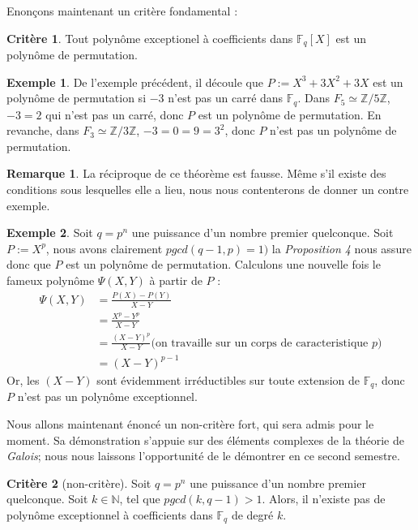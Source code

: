 \documentclass[12pt]{article}
\newcommand{\Fq}{\mathds{F}_q}
\theoremstyle{definition}
\newtheorem{example}{Exemple}
\newtheorem{rem}{Remarque}
\newtheorem{crit}{Critère}
\begin{document}
Enonçons maintenant un critère fondamental :

\begin{crit}
Tout polynôme exceptionel à coefficients dans $\Fq[X]$ est un polynôme de permutation.
\end{crit}

\begin{example}
De l'exemple précédent, il découle que $P := X^3 +3X^2 + 3X$ est un polynôme de permutation si $-3$ n'est pas un carré dans $\Fq$. \newline
Dans $F_5 \simeq \mathds{Z}/5\mathds{Z}$, $-3 = 2$ qui n'est pas un carré, donc $P$ est un polynôme de permutation. En revanche, dans $F_3 \simeq \mathds{Z}/ 3\mathds{Z}$, $-3 = 0 = 9 = 3^2$, donc $P$ n'est pas un polynôme de permutation.
\end{example}

\begin{rem}
La réciproque de ce théorème est fausse. Même s'il existe des conditions sous lesquelles elle a lieu, nous nous contenterons de donner un contre exemple.
\end{rem}

\begin{example}
Soit $q = p^n$ une puissance d'un nombre premier quelconque. Soit $P := X^p$, nous avons clairement $pgcd(q-1, p) = 1)$ la \textit{Proposition 4} nous assure donc que $P$ est un polynôme de permutation. Calculons une nouvelle fois le fameux polynôme $\Psi(X,Y)$ à partir de $P$ :
	\begin{align*}
\Psi(X,Y) &= \displaystyle\frac{P(X) - P(Y)}{X-Y} \\
&= \displaystyle\frac{X^p - Y^p}{X-Y} \\
&= \displaystyle\frac{(X-Y)^p}{X-Y} \text{(on travaille sur un corps de caracteristique $p$)} \\
&= (X-Y)^{p-1}
	\end{align*}
Or, les $(X-Y)$ sont évidemment irréductibles sur toute extension de $\Fq$, donc $P$ n'est pas un polynôme exceptionnel.
\end{example}
Nous allons maintenant énoncé un non-critère fort, qui sera admis pour le moment. Sa démonstration s'appuie sur des éléments complexes de la théorie de \textit{Galois}; nous nous laissons l'opportunité de le démontrer en ce second semestre.

\begin{crit}[non-critère]
Soit $q = p^n$ une puissance d'un nombre premier quelconque. Soit $k \in \mathds{N}$, tel que $pgcd(k, q-1) > 1$. Alors, il n'existe pas de polynôme exceptionnel à coefficients dans $\Fq$ de degré $k$.
\end{crit}
\end{document}
